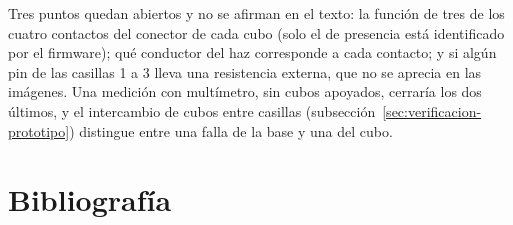 \documentclass{book}
\begin{document}
Tres puntos quedan abiertos y no se afirman en el texto: la función de tres de los cuatro contactos del conector de cada cubo (solo el de presencia está identificado por el firmware); qué conductor del haz corresponde a cada contacto; y si algún pin de las casillas 1 a 3 lleva una resistencia externa, que no se aprecia en las imágenes. Una medición con multímetro, sin cubos apoyados, cerraría los dos últimos, y el intercambio de cubos entre casillas (subsección~\ref{sec:verificacion-prototipo}) distingue entre una falla de la base y una del cubo.

\flushbottom
\chapter{Bibliografía}


\end{document}
